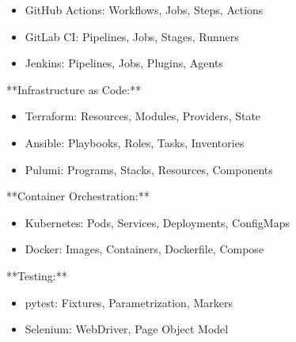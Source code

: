 \documentclass[11pt,a4paper]{article}
\begin{document}
\begin{itemize}
\item GitHub Actions: Workflows, Jobs, Steps, Actions
\end{itemize}

\begin{itemize}
\item GitLab CI: Pipelines, Jobs, Stages, Runners
\end{itemize}

\begin{itemize}
\item Jenkins: Pipelines, Jobs, Plugins, Agents
\end{itemize}

**Infrastructure as Code:**

\begin{itemize}
\item Terraform: Resources, Modules, Providers, State
\end{itemize}

\begin{itemize}
\item Ansible: Playbooks, Roles, Tasks, Inventories
\end{itemize}

\begin{itemize}
\item Pulumi: Programs, Stacks, Resources, Components
\end{itemize}

**Container Orchestration:**

\begin{itemize}
\item Kubernetes: Pods, Services, Deployments, ConfigMaps
\end{itemize}

\begin{itemize}
\item Docker: Images, Containers, Dockerfile, Compose
\end{itemize}

**Testing:**

\begin{itemize}
\item pytest: Fixtures, Parametrization, Markers
\end{itemize}

\begin{itemize}
\item Selenium: WebDriver, Page Object Model
\end{itemize}
\end{document}
